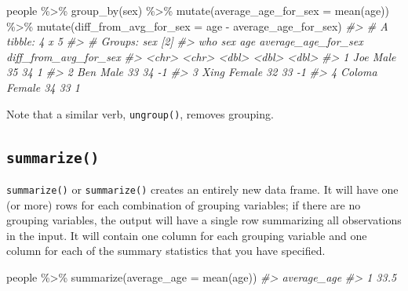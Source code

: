\documentclass[
]{book}
\newenvironment{Shaded}{\begin{snugshade}}{\end{snugshade}}
\newcommand{\AttributeTok}[1]{\textcolor[rgb]{0.77,0.63,0.00}{#1}}
\newcommand{\CommentTok}[1]{\textcolor[rgb]{0.56,0.35,0.01}{\textit{#1}}}
\newcommand{\FunctionTok}[1]{\textcolor[rgb]{0.00,0.00,0.00}{#1}}
\newcommand{\NormalTok}[1]{#1}
\newcommand{\SpecialCharTok}[1]{\textcolor[rgb]{0.00,0.00,0.00}{#1}}
\begin{document}
\begin{Shaded}
\begin{Highlighting}[]
\NormalTok{people }\SpecialCharTok{\%\textgreater{}\%} 
  \FunctionTok{group\_by}\NormalTok{(sex) }\SpecialCharTok{\%\textgreater{}\%}
  \FunctionTok{mutate}\NormalTok{(}\AttributeTok{average\_age\_for\_sex =} \FunctionTok{mean}\NormalTok{(age)) }\SpecialCharTok{\%\textgreater{}\%}
  \FunctionTok{mutate}\NormalTok{(}\AttributeTok{diff\_from\_avg\_for\_sex =}\NormalTok{ age }\SpecialCharTok{{-}}\NormalTok{ average\_age\_for\_sex)}
\CommentTok{\#\textgreater{} \# A tibble: 4 x 5}
\CommentTok{\#\textgreater{} \# Groups:   sex [2]}
\CommentTok{\#\textgreater{}   who    sex      age average\_age\_for\_sex diff\_from\_avg\_for\_sex}
\CommentTok{\#\textgreater{}   \textless{}chr\textgreater{}  \textless{}chr\textgreater{}  \textless{}dbl\textgreater{}               \textless{}dbl\textgreater{}                 \textless{}dbl\textgreater{}}
\CommentTok{\#\textgreater{} 1 Joe    Male      35                  34                     1}
\CommentTok{\#\textgreater{} 2 Ben    Male      33                  34                    {-}1}
\CommentTok{\#\textgreater{} 3 Xing   Female    32                  33                    {-}1}
\CommentTok{\#\textgreater{} 4 Coloma Female    34                  33                     1}
\end{Highlighting}
\end{Shaded}

Note that a similar verb, \texttt{ungroup()}, removes grouping.

\hypertarget{summarize}{%
\subsection*{\texorpdfstring{\texttt{summarize()}}{summarize()}}\label{summarize}}

\texttt{summarize()} or \texttt{summarize()} creates an entirely new data frame. It will have one (or more) rows for each combination of grouping variables; if there are no grouping variables, the output will have a single row summarizing all observations in the input. It will contain one column for each grouping variable and one column for each of the summary statistics that you have specified.

\begin{Shaded}
\begin{Highlighting}[]
\NormalTok{people }\SpecialCharTok{\%\textgreater{}\%} 
  \FunctionTok{summarize}\NormalTok{(}\AttributeTok{average\_age =} \FunctionTok{mean}\NormalTok{(age))}
\CommentTok{\#\textgreater{}   average\_age}
\CommentTok{\#\textgreater{} 1        33.5}
\end{Highlighting}
\end{Shaded}
\end{document}

